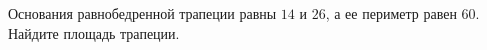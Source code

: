 \begin{ex}
	\begin{condition}
		Основания равнобедренной трапеции равны \( 14  \) и \( 26 \), а ее периметр равен \( 60 \). Найдите площадь трапеции.
	\end{condition}
\end{ex}